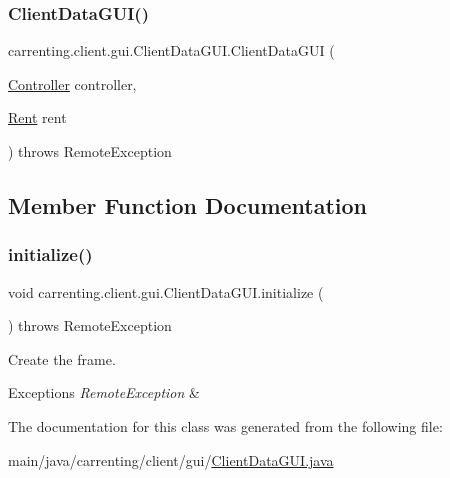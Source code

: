 \subsubsection{\texorpdfstring{ClientDataGUI()}{ClientDataGUI()}}
{\footnotesize\ttfamily carrenting.\+client.\+gui.\+Client\+Data\+G\+U\+I.\+Client\+Data\+G\+UI (\begin{DoxyParamCaption}\item[{\mbox{\hyperlink{classcarrenting_1_1client_1_1_controller}{Controller}}}]{controller,  }\item[{\mbox{\hyperlink{classcarrenting_1_1server_1_1jdo_1_1_rent}{Rent}}}]{rent }\end{DoxyParamCaption}) throws Remote\+Exception}



\subsection{Member Function Documentation}
\mbox{\label{classcarrenting_1_1client_1_1gui_1_1_client_data_g_u_i_a2eb7f748bf70c5f4e42c71106a604a40}} 
\subsubsection{\texorpdfstring{initialize()}{initialize()}}
{\footnotesize\ttfamily void carrenting.\+client.\+gui.\+Client\+Data\+G\+U\+I.\+initialize (\begin{DoxyParamCaption}{ }\end{DoxyParamCaption}) throws Remote\+Exception}

Create the frame. 
\begin{DoxyExceptions}{Exceptions}
{\em Remote\+Exception} & \\
\hline
\end{DoxyExceptions}


The documentation for this class was generated from the following file\+:\begin{DoxyCompactItemize}
\item 
main/java/carrenting/client/gui/\mbox{\hyperlink{_client_data_g_u_i_8java}{Client\+Data\+G\+U\+I.\+java}}\end{DoxyCompactItemize}
